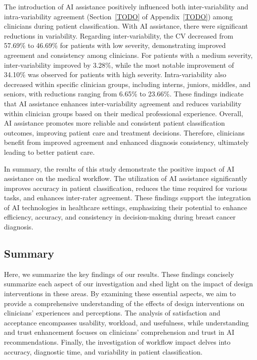 The introduction of \ac{AI} assistance positively influenced both inter-variability and intra-variability agreement (Section~\ref{TODO} of Appendix~\ref{TODO}) among clinicians during patient classification.
With \ac{AI} assistance, there were significant reductions in variability.
Regarding inter-variability, the \ac{CV} decreased from 57.69\% to 46.69\% for patients with low severity, demonstrating improved agreement and consistency among clinicians.
For patients with a medium severity, inter-variability improved by 3.28\%, while the most notable improvement of 34.10\% was observed for patients with high severity.
Intra-variability also decreased within specific clinician groups, including interns, juniors, middles, and seniors, with reductions ranging from 6.65\% to 23.66\%.
These findings indicate that \ac{AI} assistance enhances inter-variability agreement and reduces variability within clinician groups based on their medical professional experience.
Overall, \ac{AI} assistance promotes more reliable and consistent patient classification outcomes, improving patient care and treatment decisions.
Therefore, clinicians benefit from improved agreement and enhanced diagnosis consistency, ultimately leading to better patient care.

In summary, the results of this study demonstrate the positive impact of \ac{AI} assistance on the medical workflow.
The utilization of \ac{AI} assistance significantly improves accuracy in patient classification, reduces the time required for various tasks, and enhances inter-rater agreement.
These findings support the integration of \ac{AI} technologies in healthcare settings, emphasizing their potential to enhance efficiency, accuracy, and consistency in decision-making during breast cancer diagnosis.

\subsection{Summary}
\label{sec:chap005006004}

Here, we summarize the key findings of our results.
These findings concisely summarize each aspect of our investigation and shed light on the impact of design interventions in these areas.
By examining these essential aspects, we aim to provide a comprehensive understanding of the effects of design interventions on clinicians' experiences and perceptions.
The analysis of satisfaction and acceptance encompasses usability, workload, and usefulness, while understanding and trust enhancement focuses on clinicians' comprehension and trust in \ac{AI} recommendations.
Finally, the investigation of workflow impact delves into accuracy, diagnostic time, and variability in patient classification.

